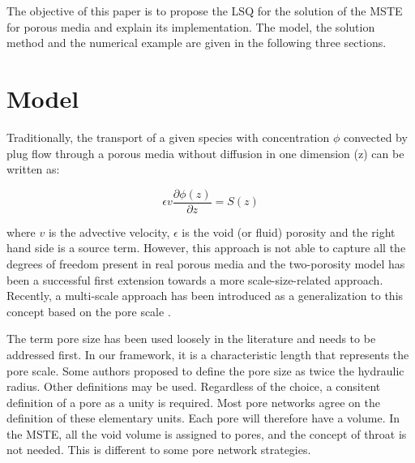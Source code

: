 \documentclass{CFD2011}
\newcommand{\newf}[1]{#1}
\newcommand{\nof}[1]{\textcolor{cyan}{}}
\begin{document}
The objective of this paper is to propose \nof{and explain how to use} \newf{the }LSQ for the solution of the \nof{multi-scale transport equation}\newf{MSTE} for porous media \newf{and explain its implementation}. The \nof{multi-scale transport}\newf{model}, the solution method and \nof{a}\newf{the} numerical example are given in the following three sections.

\section{Model}

Traditionally, the transport of a given species with concentration $\phi$ convected by plug flow through a porous media without diffusion in one dimension (z) can be written as:

\begin{equation}
\epsilon v \frac{\partial \phi(z)}{\partial z}=S(z)
\end{equation}

\noindent where $v$ is the advective velocity, $\epsilon$ is the void (or fluid) porosity and the right hand side is a source term. However, this approach is not able to capture all the degrees of freedom present in real porous media and the two-porosity model has been a successful first extension towards a more scale-size-related approach. Recently, a multi-scale approach has been introduced as a generalization to this concept based on the pore scale \cite{DupuySchwarz}.

The term \nof{pore-size have}\newf{pore size has} been used loosely in the literature and needs to be addressed first. \newf{In our framework, it is a characteristic length that represents the pore scale. } Some authors \cite{dullien1991} proposed \nof{to use}\newf{to define the pore size as} twice the hydraulic radius\nof{as a convenient definition but others might work as well in the present approach since what we are after is a characteristic length that will represent the pore scale}. \nof{Any of these choices requires a proper definition of a pore as a unity, for which any arbitrary definition of a portion of the void volume can chosen where a pore size can be measure (e.g. hydraulic radius) for each pore.}\newf{Other definitions may be used. Regardless of the choice, a consitent definition of a pore as a unity is required.} Most pore networks agree on the definition of these elementary units. Each pore will therefore have a volume. In the MSTE, all the void volume is assigned to pores, and the concept of throat \citep{oren2002, blunt2002, piri2005} is not needed\newf{. This is different to} \nof{making a difference with }some pore network strategies. 
\end{document}
